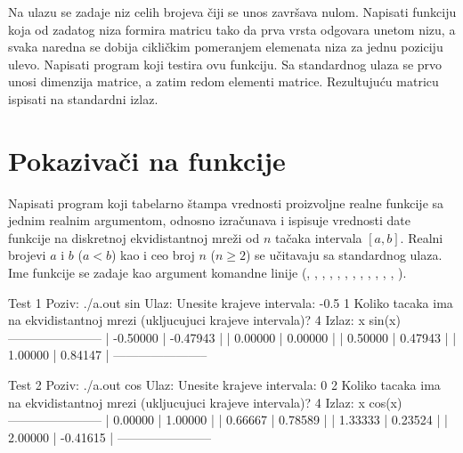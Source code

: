 \begin{Exercise}[label=344]
Na ulazu se zadaje niz celih brojeva čiji se unos završava nulom.
Napisati funkciju koja od zadatog niza formira matricu tako da
prva vrsta odgovara unetom nizu, a svaka naredna se dobija
cikličkim pomeranjem elemenata niza za jednu poziciju ulevo.
Napisati program koji testira ovu funkciju. Sa standardnog ulaza
se prvo unosi dimenzija matrice, a zatim redom elementi matrice.
Rezultujuću matricu ispisati na standardni izlaz.
\end{Exercise}
\begin{Answer}[ref=344]
\end{Answer}

\section{Pokazivači na funkcije}

\begin{Exercise}[label=345]
Napisati program koji tabelarno štampa vrednosti proizvoljne realne funkcije sa jednim realnim
argumentom, odnosno izračunava i ispisuje
vrednosti date funkcije na diskretnoj ekvidistantnoj mreži od
$n$ tačaka intervala $[a, b]$. Realni brojevi
$a$ i $b$ ($a<b$) kao i ceo broj $n$
($n \geq 2$) se učitavaju sa standardnog ulaza. Ime funkcije
se zadaje kao argument komandne linije (, , , ,
, , , , , , , , ).

\begin{maxitest}
\begin{test}{Test 1}
Poziv: ./a.out sin
Ulaz: Unesite krajeve intervala:
      -0.5 1
      Koliko tacaka ima na ekvidistantnoj mrezi (ukljucujuci krajeve intervala)?
      4
Izlaz:      x        sin(x)
      -----------------------
      | -0.50000 | -0.47943 |
      |  0.00000 |  0.00000 |
      |  0.50000 |  0.47943 |
      |  1.00000 |  0.84147 |
      -----------------------
\end{test}
\end{maxitest}

\begin{maxitest}
\begin{test}{Test 2}
Poziv: ./a.out cos
Ulaz: Unesite krajeve intervala:
      0 2
      Koliko tacaka ima na ekvidistantnoj mrezi (ukljucujuci krajeve intervala)?
      4
Izlaz:      x        cos(x)
       -----------------------
       |  0.00000 |  1.00000 |
       |  0.66667 |  0.78589 |
       |  1.33333 |  0.23524 |
       |  2.00000 | -0.41615 |
       -----------------------
\end{test}
\end{maxitest}
\end{Exercise}
\begin{Answer}[ref=345]
\end{Answer}

